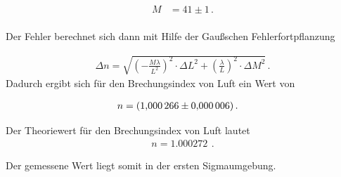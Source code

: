 \begin{align*}
  M &= 41 \pm 1 \, .\\
\end{align*}

Der Fehler berechnet sich dann mit Hilfe der Gaußschen Fehlerfortpflanzung

\begin{align*}
  \Delta{n} = \sqrt{\left( -\frac{M \lambda}{L^2} \right)^2 \cdot \Delta{L}^2
  + \left(\frac{\lambda}{L} \right)^2 \cdot \Delta{M}^2} \, .
\end{align*}
Dadurch ergibt sich für den Brechungsindex von Luft ein Wert von

\begin{align*}
n &= \SI{1.000266 \pm 0.000006}{} \, .
\end{align*}

Der Theoriewert für den Brechungsindex von Luft lautet
\begin{align*}
  n = \SI{1.000272}{} \, .
\end{align*}

Der gemessene Wert liegt somit in der ersten Sigmaumgebung.
